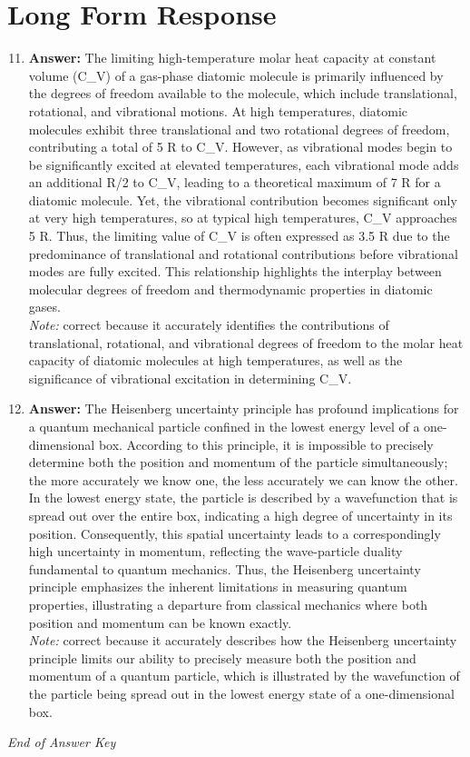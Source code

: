\documentclass[12pt]{article}
\begin{document}
\section*{Long Form Response}
\begin{enumerate}[label=\arabic*.]
\setcounter{enumi}{10}
\item \textbf{Answer:} The limiting high-temperature molar heat capacity at constant volume (C\_V) of a gas-phase diatomic molecule is primarily influenced by the degrees of freedom available to the molecule, which include translational, rotational, and vibrational motions. At high temperatures, diatomic molecules exhibit three translational and two rotational degrees of freedom, contributing a total of 5 R to C\_V. However, as vibrational modes begin to be significantly excited at elevated temperatures, each vibrational mode adds an additional R/2 to C\_V, leading to a theoretical maximum of 7 R for a diatomic molecule. Yet, the vibrational contribution becomes significant only at very high temperatures, so at typical high temperatures, C\_V approaches 5 R. Thus, the limiting value of C\_V is often expressed as 3.5 R due to the predominance of translational and rotational contributions before vibrational modes are fully excited. This relationship highlights the interplay between molecular degrees of freedom and thermodynamic properties in diatomic gases.
\\ \textit{Note:} correct because it accurately identifies the contributions of translational, rotational, and vibrational degrees of freedom to the molar heat capacity of diatomic molecules at high temperatures, as well as the significance of vibrational excitation in determining C\_V.
\item \textbf{Answer:} The Heisenberg uncertainty principle has profound implications for a quantum mechanical particle confined in the lowest energy level of a one-dimensional box. According to this principle, it is impossible to precisely determine both the position and momentum of the particle simultaneously; the more accurately we know one, the less accurately we can know the other. In the lowest energy state, the particle is described by a wavefunction that is spread out over the entire box, indicating a high degree of uncertainty in its position. Consequently, this spatial uncertainty leads to a correspondingly high uncertainty in momentum, reflecting the wave-particle duality fundamental to quantum mechanics. Thus, the Heisenberg uncertainty principle emphasizes the inherent limitations in measuring quantum properties, illustrating a departure from classical mechanics where both position and momentum can be known exactly.
\\ \textit{Note:} correct because it accurately describes how the Heisenberg uncertainty principle limits our ability to precisely measure both the position and momentum of a quantum particle, which is illustrated by the wavefunction of the particle being spread out in the lowest energy state of a one-dimensional box.
\end{enumerate}

\vfill
\noindent\textit{End of Answer Key}
\end{document}
